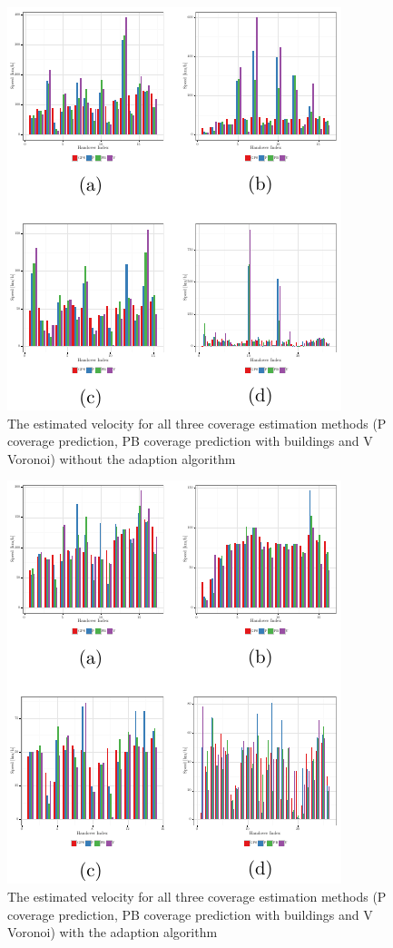 \documentclass[twocolumn]{bmcart}%
\begin{document}
\begin{backmatter}
	
	\begin{figure}[h!]
		\label{fig:velocity}
		\caption{ The estimated velocity for all three coverage estimation methods (P coverage prediction, PB coverage prediction with buildings and V Voronoi) without the adaption algorithm
		}
		\includegraphics{images/speeds}
	\end{figure}
	
	\begin{figure}[h!]
		\label{fig:velocityadaption}
		\caption{ The estimated velocity for all three coverage estimation methods (P coverage prediction, PB coverage prediction with buildings and V Voronoi) with the adaption algorithm
		}
		\includegraphics{images/speedsAdaption}
	\end{figure}
	

\end{backmatter}
\end{document}
